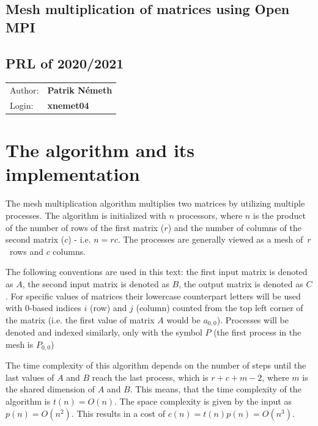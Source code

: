 \documentclass[pdftex, 11pt, a4paper, titlepage]{article}
\begin{document}
    \begin{center}
        \section*{Mesh multiplication of matrices using Open MPI}
        \subsection*{PRL of 2020/2021}
        \begin{tabular}{ l l }
            Author: & \textbf{Patrik Németh} \\
            Login: & \textbf{xnemet04}
        \end{tabular}
    \end{center}

    \section{The algorithm and its implementation}
    The mesh multiplication algorithm multiplies two matrices by utilizing multiple
    processes.
    The algorithm is initialized with $n$ processors, where $n$ is the product of
    the number of rows of the first matrix ($r$) and the number of columns of the
    second matrix ($c$) - i.e. $n = rc$. The processes are generally viewed as
    a mesh of~$r$~rows and $c$ columns.

    The following conventions are used in this text: the first input matrix is
    denoted as $A$, the second input matrix is denoted as $B$, the output matrix
    is denoted as $C$. For specific values of matrices their lowercase counterpart
    letters will be used with $0$-based indices $i$ (row) and $j$ (column) counted
    from the top left corner of the matrix (i.e. the first value of matrix $A$ would
    be $a_{0,0}$). Processes will be denoted and indexed similarly, only with the
    symbol $P$ (the first process in the mesh is $P_{0,0}$)

    The time complexity of this algorithm depends on the number of steps until
    the last values of $A$ and $B$ reach the last process, which is $r + c + m - 2$,
    where $m$ is the shared dimension of $A$ and $B$. This means, that the time
    complexity of the algorithm is $t(n) = O(n)$. The space complexity is given by
    the input as $p(n) = O(n^2)$. This results in a cost of $c(n) = t(n)p(n) = O(n^3)$.
\end{document}
